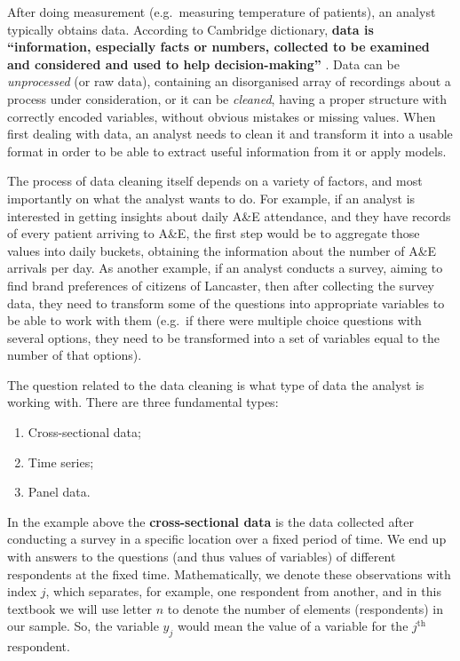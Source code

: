 \documentclass[
]{book}
\providecommand{\tightlist}{%
  \setlength{\itemsep}{0pt}\setlength{\parskip}{0pt}}
\theoremstyle{definition}
\theoremstyle{definition}
\theoremstyle{definition}
\theoremstyle{definition}
\theoremstyle{remark}
\begin{document}
After doing measurement (e.g.~measuring temperature of patients), an analyst typically obtains data. According to Cambridge dictionary, \textbf{data is ``information, especially facts or numbers, collected to be examined and considered and used to help decision-making''} \citep{CambridgeData}. Data can be \emph{unprocessed} (or raw data), containing an disorganised array of recordings about a process under consideration, or it can be \emph{cleaned}, having a proper structure with correctly encoded variables, without obvious mistakes or missing values. When first dealing with data, an analyst needs to clean it and transform it into a usable format in order to be able to extract useful information from it or apply models.

The process of data cleaning itself depends on a variety of factors, and most importantly on what the analyst wants to do. For example, if an analyst is interested in getting insights about daily A\&E attendance, and they have records of every patient arriving to A\&E, the first step would be to aggregate those values into daily buckets, obtaining the information about the number of A\&E arrivals per day. As another example, if an analyst conducts a survey, aiming to find brand preferences of citizens of Lancaster, then after collecting the survey data, they need to transform some of the questions into appropriate variables to be able to work with them (e.g.~if there were multiple choice questions with several options, they need to be transformed into a set of variables equal to the number of that options).

The question related to the data cleaning is what type of data the analyst is working with. There are three fundamental types:

\begin{enumerate}
\def\labelenumi{\arabic{enumi}.}
\tightlist
\item
  Cross-sectional data;
\item
  Time series;
\item
  Panel data.
\end{enumerate}

In the example above the \textbf{cross-sectional data} is the data collected after conducting a survey in a specific location over a fixed period of time. We end up with answers to the questions (and thus values of variables) of different respondents at the fixed time. Mathematically, we denote these observations with index \(j\), which separates, for example, one respondent from another, and in this textbook we will use letter \(n\) to denote the number of elements (respondents) in our sample. So, the variable \(y_j\) would mean the value of a variable for the \(j^{\mathrm{th}}\) respondent.
\end{document}
